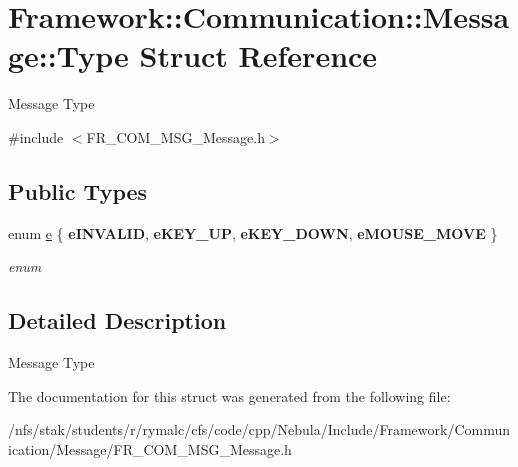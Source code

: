 \hypertarget{structFramework_1_1Communication_1_1Message_1_1Type}{
\section{Framework::Communication::Message::Type Struct Reference}
\label{structFramework_1_1Communication_1_1Message_1_1Type}
}


Message Type  


{\ttfamily \#include $<$FR\_\-COM\_\-MSG\_\-Message.h$>$}\subsection*{Public Types}
\begin{DoxyCompactItemize}
\item 
enum \hyperlink{structFramework_1_1Communication_1_1Message_1_1Type_a73734b087941ec0a4642d0bd6a35000b}{e} \{ {\bfseries eINVALID}, 
{\bfseries eKEY\_\-UP}, 
{\bfseries eKEY\_\-DOWN}, 
{\bfseries eMOUSE\_\-MOVE}
 \}
\begin{DoxyCompactList}\small\item\em enum \item\end{DoxyCompactList}\end{DoxyCompactItemize}


\subsection{Detailed Description}
Message Type 

The documentation for this struct was generated from the following file:\begin{DoxyCompactItemize}
\item 
/nfs/stak/students/r/rymalc/cfs/code/cpp/Nebula/Include/Framework/Communication/Message/FR\_\-COM\_\-MSG\_\-Message.h\end{DoxyCompactItemize}
